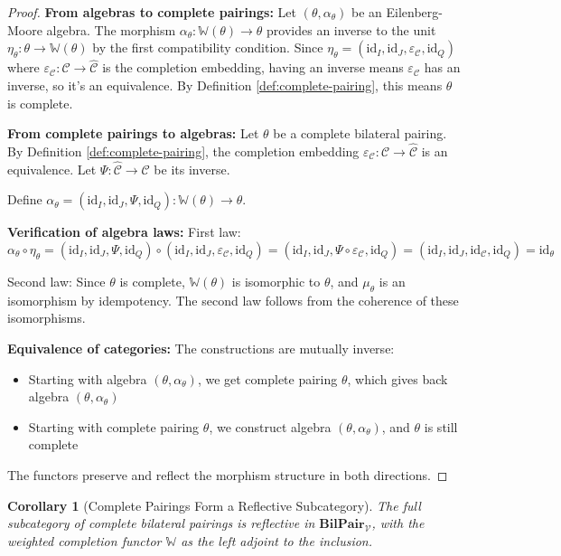 \documentclass[11pt]{article}
\theoremstyle{plain}
\newtheorem{corollary}[theorem]{Corollary}
\theoremstyle{definition}
\theoremstyle{remark}
\newcommand{\V}{\mathcal{V}}
\newcommand{\C}{\mathcal{C}}
\newcommand{\id}{\mathrm{id}}
\newcommand{\wh}[1]{\widehat{#1}}
\begin{document}
\begin{proof}
\textbf{From algebras to complete pairings:}
Let $(\theta, \alpha_\theta)$ be an Eilenberg-Moore algebra. The morphism $\alpha_\theta : \mathbb{W}(\theta) \to \theta$ provides an inverse to the unit $\eta_\theta : \theta \to \mathbb{W}(\theta)$ by the first compatibility condition. Since $\eta_\theta = (\id_I, \id_J, \varepsilon_\C, \id_Q)$ where $\varepsilon_\C : \C \to \wh{\C}$ is the completion embedding, having an inverse means $\varepsilon_\C$ has an inverse, so it's an equivalence. By Definition \ref{def:complete-pairing}, this means $\theta$ is complete.

\textbf{From complete pairings to algebras:}
Let $\theta$ be a complete bilateral pairing. By Definition \ref{def:complete-pairing}, the completion embedding $\varepsilon_\C : \C \to \wh{\C}$ is an equivalence. Let $\Psi : \wh{\C} \to \C$ be its inverse.

Define $\alpha_\theta = (\id_I, \id_J, \Psi, \id_Q) : \mathbb{W}(\theta) \to \theta$.

\textbf{Verification of algebra laws:}
First law: $\alpha_\theta \circ \eta_\theta = (\id_I, \id_J, \Psi, \id_Q) \circ (\id_I, \id_J, \varepsilon_\C, \id_Q) = (\id_I, \id_J, \Psi \circ \varepsilon_\C, \id_Q) = (\id_I, \id_J, \id_\C, \id_Q) = \id_\theta$ 

Second law: Since $\theta$ is complete, $\mathbb{W}(\theta)$ is isomorphic to $\theta$, and $\mu_\theta$ is an isomorphism by idempotency. The second law follows from the coherence of these isomorphisms.

\textbf{Equivalence of categories:}
The constructions are mutually inverse:
\begin{itemize}
\item Starting with algebra $(\theta, \alpha_\theta)$, we get complete pairing $\theta$, which gives back algebra $(\theta, \alpha_\theta)$
\item Starting with complete pairing $\theta$, we construct algebra $(\theta, \alpha_\theta)$, and $\theta$ is still complete
\end{itemize}

The functors preserve and reflect the morphism structure in both directions.
\end{proof}

\begin{corollary}[Complete Pairings Form a Reflective Subcategory]\label{cor:reflective-subcategory}
The full subcategory of complete bilateral pairings is reflective in $\mathbf{BilPair}_\V$, with the weighted completion functor $\mathbb{W}$ as the left adjoint to the inclusion.
\end{corollary}
\end{document}
